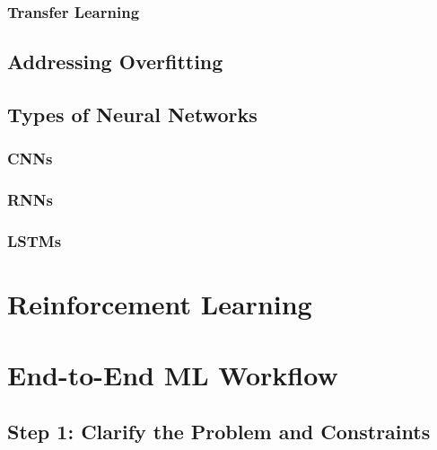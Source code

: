 \documentclass[
]{book}
\begin{document}
\hypertarget{transfer-learning}{%
\subsubsection{Transfer Learning}\label{transfer-learning}}

\hypertarget{addressing-overfitting}{%
\subsection{Addressing Overfitting}\label{addressing-overfitting}}

\hypertarget{types-of-neural-networks}{%
\subsection{Types of Neural Networks}\label{types-of-neural-networks}}

\hypertarget{cnns}{%
\subsubsection{CNNs}\label{cnns}}

\hypertarget{rnns}{%
\subsubsection{RNNs}\label{rnns}}

\hypertarget{lstms}{%
\subsubsection{LSTMs}\label{lstms}}

\hypertarget{reinforcement-learning}{%
\section{Reinforcement Learning}\label{reinforcement-learning}}

\hypertarget{end-to-end-ml-workflow}{%
\section{End-to-End ML Workflow}\label{end-to-end-ml-workflow}}

\hypertarget{step-1-clarify-the-problem-and-constraints}{%
\subsection{Step 1: Clarify the Problem and Constraints}\label{step-1-clarify-the-problem-and-constraints}}
\end{document}
